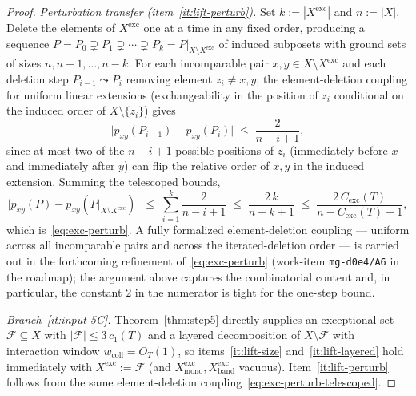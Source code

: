 \begin{proof}
\emph{Perturbation transfer (item~\ref{it:lift-perturb}).}
Set $k := |X^{\mathrm{exc}}|$ and $n := |X|$.  Delete the elements of
$X^{\mathrm{exc}}$ one at a time in any fixed order, producing a
sequence $P = P_0 \supsetneq P_1 \supsetneq \cdots \supsetneq P_k =
P|_{X \setminus X^{\mathrm{exc}}}$ of induced subposets with ground
sets of sizes $n, n-1, \ldots, n-k$.  For each incomparable pair
$x, y \in X \setminus X^{\mathrm{exc}}$ and each deletion step
$P_{i-1} \leadsto P_i$ removing element $z_i \ne x, y$, the
element-deletion coupling for uniform linear extensions
(exchangeability in the position of $z_i$ conditional on the
induced order of $X \setminus \{z_i\}$) gives
\[
  \bigl| p_{xy}(P_{i-1}) - p_{xy}(P_i) \bigr|
  \;\le\; \frac{2}{n - i + 1},
\]
since at most two of the $n - i + 1$ possible positions of $z_i$
(immediately before $x$ and immediately after $y$) can flip the
relative order of $x, y$ in the induced extension.  Summing the
telescoped bounds,
\begin{equation}\label{eq:exc-perturb-telescoped}
  \big|p_{xy}(P) - p_{xy}(P|_{X \setminus X^{\mathrm{exc}}})\big|
  \;\le\; \sum_{i=1}^{k} \frac{2}{n - i + 1}
  \;\le\; \frac{2\,k}{n - k + 1}
  \;\le\; \frac{2\,C_{\mathrm{exc}}(T)}{n - C_{\mathrm{exc}}(T) + 1},
\end{equation}
which is~\eqref{eq:exc-perturb}.  A fully formalized element-deletion
coupling — uniform across all incomparable pairs and across the
iterated-deletion order — is carried out in the forthcoming
refinement of~\eqref{eq:exc-perturb} (work-item \texttt{mg-d0e4/A6}
in the roadmap); the argument above captures the combinatorial
content and, in particular, the constant $2$ in the numerator is
tight for the one-step bound.

\emph{Branch~\ref{it:input-5C}.}
Theorem~\ref{thm:step5} directly supplies an exceptional set
$\mathcal F \subseteq X$ with $|\mathcal F| \le 3\,c_1(T)$ and a
layered decomposition of $X \setminus \mathcal F$ with interaction
window $w_{\mathrm{coll}} = O_T(1)$, so items~\ref{it:lift-size}
and~\ref{it:lift-layered} hold immediately with
$X^{\mathrm{exc}} := \mathcal F$ (and $X^{\mathrm{exc}}_{\mathrm{mono}},
X^{\mathrm{exc}}_{\mathrm{band}}$ vacuous).
Item~\ref{it:lift-perturb} follows from the same element-deletion
coupling~\eqref{eq:exc-perturb-telescoped}.
\end{proof}

